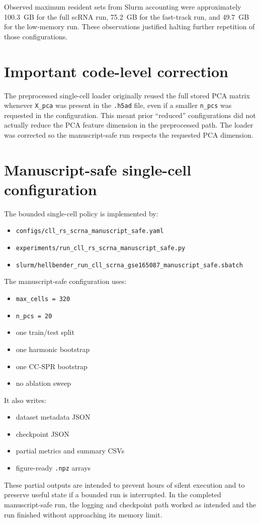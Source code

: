 \documentclass[11pt]{article}
\begin{document}
Observed maximum resident sets from Slurm accounting were approximately 100.3~GB for the full scRNA run, 75.2~GB for the fast-track run, and 49.7~GB for the low-memory run. These observations justified halting further repetition of those configurations.

\section{Important code-level correction}
The preprocessed single-cell loader originally reused the full stored PCA matrix whenever \texttt{X\_pca} was present in the \texttt{.h5ad} file, even if a smaller \texttt{n\_pcs} was requested in the configuration. This meant prior ``reduced'' configurations did not actually reduce the PCA feature dimension in the preprocessed path. The loader was corrected so the manuscript-safe run respects the requested PCA dimension.

\section{Manuscript-safe single-cell configuration}
The bounded single-cell policy is implemented by:
\begin{itemize}[leftmargin=1.5em]
\item \texttt{configs/cll\_rs\_scrna\_manuscript\_safe.yaml}
\item \texttt{experiments/run\_cll\_rs\_scrna\_manuscript\_safe.py}
\item \texttt{slurm/hellbender\_run\_cll\_scrna\_gse165087\_manuscript\_safe.sbatch}
\end{itemize}

The manuscript-safe configuration uses:
\begin{itemize}[leftmargin=1.5em]
\item \texttt{max\_cells = 320}
\item \texttt{n\_pcs = 20}
\item one train/test split
\item one harmonic bootstrap
\item one CC-SPR bootstrap
\item no ablation sweep
\end{itemize}

It also writes:
\begin{itemize}[leftmargin=1.5em]
\item dataset metadata JSON
\item checkpoint JSON
\item partial metrics and summary CSVs
\item figure-ready \texttt{.npz} arrays
\end{itemize}
These partial outputs are intended to prevent hours of silent execution and to preserve useful state if a bounded run is interrupted. In the completed manuscript-safe run, the logging and checkpoint path worked as intended and the run finished without approaching its memory limit.
\end{document}
